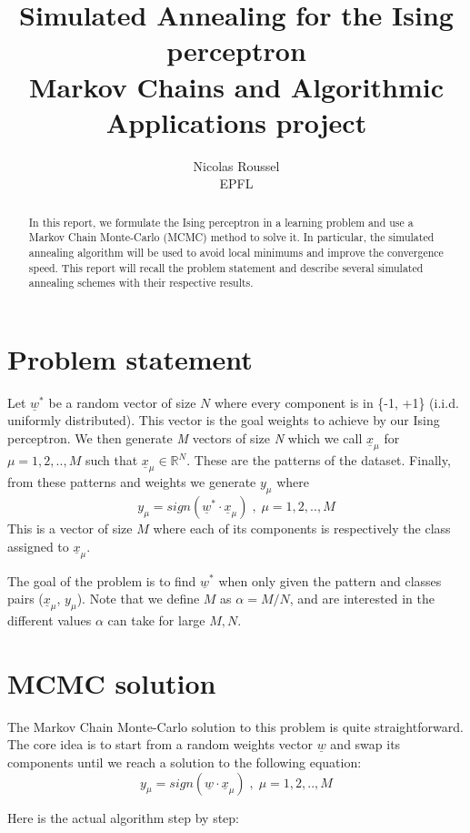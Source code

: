 \documentclass[a4paper]{article}
\title{
Simulated Annealing for the Ising perceptron \\
Markov Chains and Algorithmic Applications project}
\author{
Nicolas Roussel\\
EPFL}
\begin{document}
\maketitle

\begin{abstract}
In this report, we formulate the Ising perceptron in a learning problem and use a Markov Chain Monte-Carlo (MCMC) method to solve it. In particular, the simulated annealing algorithm will be used to avoid local minimums and improve the convergence speed. This report will recall the problem statement and describe several simulated annealing schemes with their respective results.\end{abstract}

\section{Problem statement}

Let $\underline{w}^*$ be a random vector of size $N$ where every component is in \{-1, +1\} (i.i.d. uniformly distributed). This vector is the goal weights to achieve by our Ising perceptron. We then generate \textit{M} vectors of size \textit{N} which we call $\underline{x}_{\mu}$ for $\mu = 1, 2, .., M$ such that $\underline{x}_{\mu} \in \mathbb{R}^{N}$. These are the patterns of the dataset. Finally, from these patterns and weights we generate $y_{\mu}$ where
\[y_{\mu} = sign(\underline{w}^* \cdot \underline{x}_{\mu}) \;, \;\mu = 1, 2, .., M\]
This is a vector of size $M$ where each of its components is respectively the class assigned to $\underline{x}_{\mu}$.

The goal of the problem is to find $\underline{w}^*$ when only given the pattern and classes pairs ($\underline{x}_{\mu}$, $y_{\mu}$). Note that we define $M$ as $\alpha = M/N$, and are interested in the different values $\alpha$ can take for large $M, N$.  

\section{MCMC solution}\label{MCMC_SOL}

The Markov Chain Monte-Carlo solution to this problem is quite straightforward. The core idea is to start from a random weights vector $\underline{w}$ and swap its components until we reach a solution to the following equation: 
 \[y_{\mu} = sign(\underline{w} \cdot \underline{x}_{\mu}) \;, \;\mu = 1, 2, .., M\]
 
 Here is the actual algorithm step by step:
 
\end{document}

